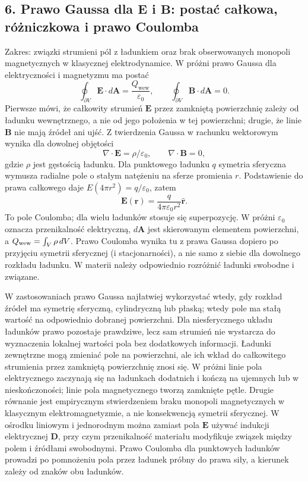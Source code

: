 \documentclass[11pt,a4paper]{article}
\begin{document}
\subsection{6. Prawo Gaussa dla \(\mathbf E\) i \(\mathbf B\): postać całkowa, różniczkowa i prawo Coulomba}
Zakres: związki strumieni pól z ładunkiem oraz brak obserwowanych monopoli magnetycznych w klasycznej elektrodynamice. W próżni prawo Gaussa dla elektryczności i magnetyzmu ma postać
\[
\oint_{\partial V}\mathbf E\cdot d\mathbf A=\frac{Q_{\mathrm{wew}}}{\varepsilon_0},
\qquad \oint_{\partial V}\mathbf B\cdot d\mathbf A=0.
\]
Pierwsze mówi, że całkowity strumień \(\mathbf E\) przez zamkniętą powierzchnię zależy od ładunku wewnętrznego, a nie od jego położenia w tej powierzchni; drugie, że linie \(\mathbf B\) nie mają źródeł ani ujść. Z twierdzenia Gaussa w rachunku wektorowym wynika dla dowolnej objętości
\[
\nabla\cdot\mathbf E=\rho/\varepsilon_0,\qquad \nabla\cdot\mathbf B=0,
\]
gdzie \(\rho\) jest gęstością ładunku. Dla punktowego ładunku \(q\) symetria sferyczna wymusza radialne pole o stałym natężeniu na sferze promienia \(r\). Podstawienie do prawa całkowego daje \(E(4\pi r^2)=q/\varepsilon_0\), zatem
\[
\mathbf E(\mathbf r)=\frac{q}{4\pi\varepsilon_0r^2}\hat{\mathbf r}.
\]
To pole Coulomba; dla wielu ładunków stosuje się superpozycję. W próżni \(\varepsilon_0\) oznacza przenikalność elektryczną, \(d\mathbf A\) jest skierowanym elementem powierzchni, a \(Q_{\rm wew}=\int_V\rho\,dV\). Prawo Coulomba wynika tu z prawa Gaussa dopiero po przyjęciu symetrii sferycznej (i stacjonarności), a nie samo z siebie dla dowolnego rozkładu ładunku. W materii należy odpowiednio rozróżnić ładunki swobodne i związane.

W zastosowaniach prawo Gaussa najłatwiej wykorzystać wtedy, gdy rozkład źródeł ma symetrię sferyczną, cylindryczną lub płaską; wtedy pole ma stałą wartość na odpowiednio dobranej powierzchni. Dla niesferycznego układu ładunków prawo pozostaje prawdziwe, lecz sam strumień nie wystarcza do wyznaczenia lokalnej wartości pola bez dodatkowych informacji. Ładunki zewnętrzne mogą zmieniać pole na powierzchni, ale ich wkład do całkowitego strumienia przez zamkniętą powierzchnię znosi się. W próżni linie pola elektrycznego zaczynają się na ładunkach dodatnich i kończą na ujemnych lub w nieskończoności; linie pola magnetycznego tworzą zamknięte pętle. Drugie równanie jest empirycznym stwierdzeniem braku monopoli magnetycznych w klasycznym elektromagnetyzmie, a nie konsekwencją symetrii sferycznej. W ośrodku liniowym i jednorodnym można zamiast pola \(\mathbf E\) używać indukcji elektrycznej \(\mathbf D\), przy czym przenikalność materiału modyfikuje związek między polem i źródłami swobodnymi. Prawo Coulomba dla punktowych ładunków prowadzi po pomnożeniu pola przez ładunek próbny do prawa siły, a kierunek zależy od znaków obu ładunków.
\end{document}
